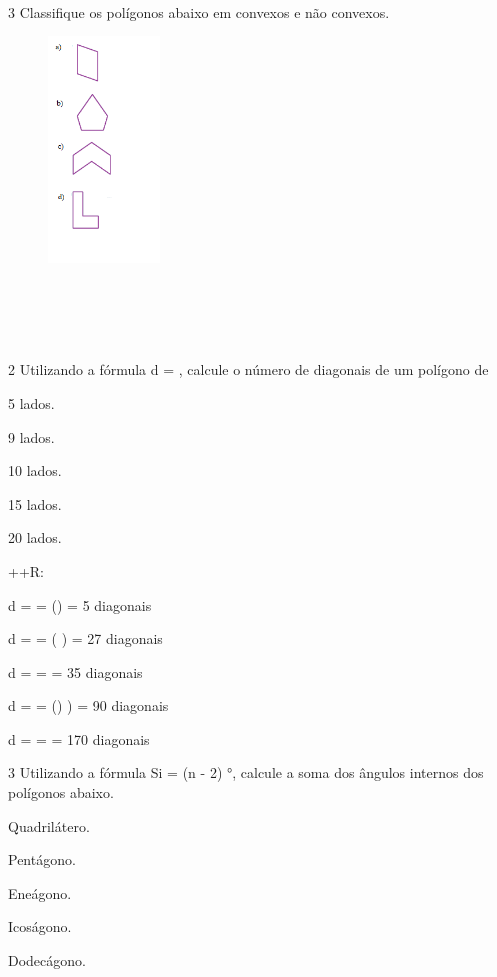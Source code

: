 \\

\num{3} Classifique os polígonos abaixo em convexos e não convexos.

\begin{figure}[H]
\centering\includegraphics[width=1.16236in,height=2.36667in]{./imgSAEB_8_MAT/media/image8.png}
\end{figure}

\\
\\
\\
\\

\num{2} Utilizando a fórmula d = , calcule o número
de diagonais de um polígono de
\item 5 lados.
\item 9 lados.
\item 10 lados.
\item 15 lados.
\item 20 lados.

++R:
\item d =  = ()
 = 5 diagonais
\item d =  = (
) = 27 diagonais
\item d =  = 
 = 35 diagonais
\item d =  = ()
) = 90 diagonais
\item d =  = 
 = 170 diagonais

\num{3} Utilizando a fórmula Si = (n - 2) °, calcule a soma dos ângulos
internos dos polígonos abaixo.
\item Quadrilátero.
\item Pentágono.
\item Eneágono.
\item Icoságono.
\item Dodecágono.

